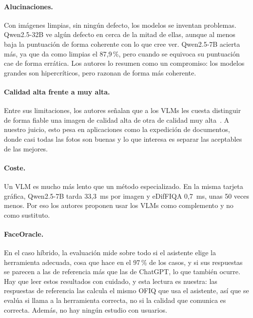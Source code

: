 \paragraph{Alucinaciones.} Con imágenes limpias, sin ningún defecto, los modelos se inventan problemas. Qwen2.5-32B ve algún defecto en cerca de la mitad de ellas, aunque al menos baja la puntuación de forma coherente con lo que cree ver. Qwen2.5-7B acierta más, ya que da como limpias el 87,9\,\%, pero cuando se equivoca su puntuación cae de forma errática. Los autores lo resumen como un compromiso: los modelos grandes son hipercríticos, pero razonan de forma más coherente.

\paragraph{Calidad alta frente a muy alta.} Entre sus limitaciones, los autores señalan que a los VLMs les cuesta distinguir de forma fiable una imagen de calidad alta de otra de calidad muy alta~\cite{Saritas_2026_FG}. A nuestro juicio, esto pesa en aplicaciones como la expedición de documentos, donde casi todas las fotos son buenas y lo que interesa es separar las aceptables de las mejores.

\paragraph{Coste.} Un VLM es mucho más lento que un método especializado. En la misma tarjeta gráfica, Qwen2.5-7B tarda 33,3~ms por imagen y eDifFIQA 0,7~ms, unas 50 veces menos. Por eso los autores proponen usar los VLMs como complemento y no como sustituto.

\paragraph{FaceOracle.} En el caso híbrido, la evaluación mide sobre todo si el asistente elige la herramienta adecuada, cosa que hace en el 97\,\% de los casos, y si sus respuestas se parecen a las de referencia más que las de ChatGPT, lo que también ocurre. Hay que leer estos resultados con cuidado, y esta lectura es nuestra: las respuestas de referencia las calcula el mismo OFIQ que usa el asistente, así que se evalúa si llama a la herramienta correcta, no si la calidad que comunica es correcta. Además, no hay ningún estudio con usuarios.

